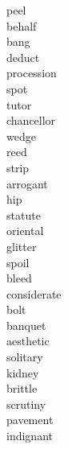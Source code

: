 \documentclass[a4paper, 11pt]{ctexart}
\begin{document}
\begin{multicols*}{3}
\begin{description}
\item[peel]

\item[behalf]

\item[bang]

\item[deduct]

\item[procession]

\item[spot]

\item[tutor]

\item[chancellor]

\item[wedge]

\item[reed]

\item[strip]

\item[arrogant]

\item[hip]

\item[statute]

\item[oriental]

\item[glitter]

\item[spoil]

\item[bleed]

\item[considerate]

\item[bolt]

\item[banquet]

\item[aesthetic]

\item[solitary]

\item[kidney]

\item[brittle]

\item[scrutiny]

\item[pavement]

\item[indignant]


\end{description}
\end{multicols*}
\end{document}
